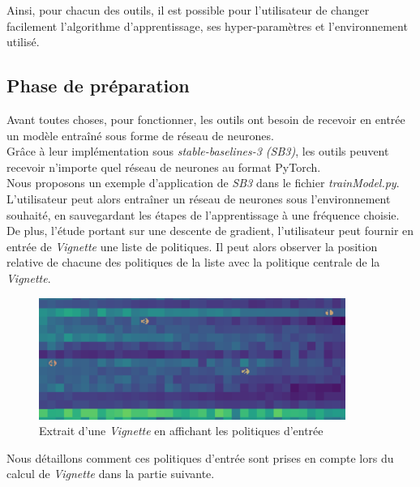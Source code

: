 \documentclass[12pt]{article}
\begin{document}
Ainsi, pour chacun des outils, il est possible pour l’utilisateur de changer facilement l’algorithme d’apprentissage, ses hyper-paramètres et l’environnement utilisé. \\

\subsection{Phase de préparation}

Avant toutes choses, pour fonctionner, les outils ont besoin de recevoir en entrée un modèle entraîné sous forme de réseau de neurones. \\

Grâce à leur implémentation sous \emph{stable-baselines-3 (SB3)}, les outils peuvent recevoir n'importe quel réseau de neurones au format PyTorch. \\

Nous proposons un exemple d'application de \emph{SB3} dans le fichier \emph{trainModel.py}. L'utilisateur peut alors entraîner un réseau de neurones sous l'environnement souhaité, en sauvegardant les étapes de l'apprentissage à une fréquence choisie. \\

De plus, l'étude portant sur une descente de gradient, l'utilisateur peut fournir en entrée de \emph{Vignette} une liste de politiques. Il peut alors observer la position relative de chacune des politiques de la liste avec la politique centrale de la \emph{Vignette}. \\

\begin{figure}[htp]
    \centering
    \includegraphics[width=10cm]{Images/politiques_entrees_vignette}
    \caption{Extrait d'une \emph{Vignette} en affichant les politiques d'entrée}
    \label{fig:exempleEntree}
\end{figure}

Nous détaillons comment ces politiques d'entrée sont prises en compte lors du calcul de \emph{Vignette} dans la partie suivante. \\
\end{document}
